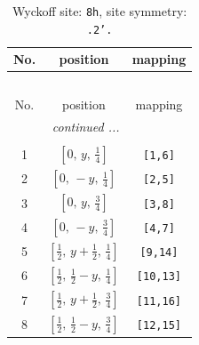 \documentclass[fleqn,8pt]{jsarticle}
\begin{document}
\begin{longtable}{ccc}
\caption{Wyckoff site: {\tt 8h}, site symmetry: {\tt .2'.}}
 \\
 \hline \hline
No. & position & mapping \\ \hline \endfirsthead

\multicolumn{2}{l}{\tablename\ \thetable{}} \\
 \hline \hline
No. & position & mapping \\ \hline \endhead

 \hline \hline
\multicolumn{2}{r}{\footnotesize\it continued ...} \\ \endfoot

 \hline \hline
\multicolumn{2}{r}{} \\ \endlastfoot

1 & $\left[ 0,\, y,\, \frac{1}{4} \right]$ & {\tt [1,6]} \\ \hline
2 & $\left[ 0,\, - y,\, \frac{1}{4} \right]$ & {\tt [2,5]} \\ \hline
3 & $\left[ 0,\, y,\, \frac{3}{4} \right]$ & {\tt [3,8]} \\ \hline
4 & $\left[ 0,\, - y,\, \frac{3}{4} \right]$ & {\tt [4,7]} \\ \hline
5 & $\left[ \frac{1}{2},\, y + \frac{1}{2},\, \frac{1}{4} \right]$ & {\tt [9,14]} \\ \hline
6 & $\left[ \frac{1}{2},\, \frac{1}{2} - y,\, \frac{1}{4} \right]$ & {\tt [10,13]} \\ \hline
7 & $\left[ \frac{1}{2},\, y + \frac{1}{2},\, \frac{3}{4} \right]$ & {\tt [11,16]} \\ \hline
8 & $\left[ \frac{1}{2},\, \frac{1}{2} - y,\, \frac{3}{4} \right]$ & {\tt [12,15]} \\
\end{longtable}
\renewcommand{\arraystretch}{1.2}
\end{document}
